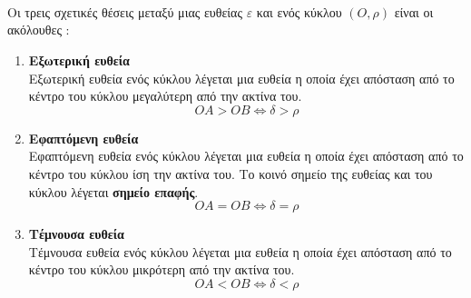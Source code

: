 \documentclass[twoside,nofonts,ektypwsh,shmeiwseis]{thewria}
\begin{document}
\mbox{}\\\\\\
Οι τρεις σχετικές θέσεις μεταξύ μιας ευθείας $ \varepsilon $ και ενός κύκλου $ \left( O,\rho\right)  $ είναι οι ακόλουθες :
\begin{enumerate}[itemsep=0mm,label=\bf\arabic*.]
\item \textbf{Εξωτερική ευθεία}\\
Εξωτερική ευθεία ενός κύκλου λέγεται μια ευθεία η οποία έχει απόσταση από το κέντρο του κύκλου μεγαλύτερη από την ακτίνα του.
\[ OA>OB\Leftrightarrow \delta>\rho \]
\item \textbf{Εφαπτόμενη ευθεία}\\
Εφαπτόμενη ευθεία ενός κύκλου λέγεται μια ευθεία η οποία έχει απόσταση από το κέντρο του κύκλου ίση την ακτίνα του.
Το κοινό σημείο της ευθείας και του κύκλου λέγεται \textbf{σημείο επαφής}.
\[ OA=OB\Leftrightarrow \delta=\rho \]
\item \textbf{Τέμνουσα ευθεία}\\
Τέμνουσα ευθεία ενός κύκλου λέγεται μια ευθεία η οποία έχει απόσταση από το κέντρο του κύκλου μικρότερη από την ακτίνα του.
\[ OA<OB\Leftrightarrow \delta<\rho \]
\end{enumerate}
\end{document}
